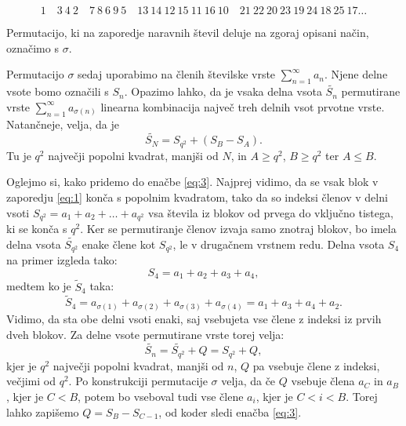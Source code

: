 \documentclass[12pt,a4paper,reqno]{amsart}
\theoremstyle{definition} %
\theoremstyle{plain} %
\newcommand{\N}{\mathbb N}
\begin{document}
\begin{equation}  
1 \quad 3\: 4\: 2 \quad 7\: 8\: 6\: 9\: 5 \quad 13\: 14\: 12\: 15\: 11\: 16\: 10 \quad 21\: 22\: 20\: 23\: 19\: 24\: 18\: 25\: 17 \ldots 
\label{eq:2}
\end{equation}

Permutacijo, ki na zaporedje naravnih števil deluje na zgoraj opisani način, označimo s $\sigma$. 

Permutacijo $\sigma$ sedaj uporabimo na členih številske vrste $\sum^{\infty}_{n=1}a_n$. Njene delne vsote bomo označili s $S_n$. Opazimo lahko, da je vsaka delna vsota $\tilde{S_n}$ permutirane vrste $\sum^{\infty}_{n=1}a_{\sigma(n)}$ linearna kombinacija največ treh delnih vsot prvotne vrste. Natančneje, velja, da je 
\begin{equation}
\tilde{S_N}=S_{q^2}+(S_B-S_A).\label{eq:3} 
\end{equation}
Tu je $q^2$ največji popolni kvadrat, manjši od $N$, in $A \geq q^2$, $B \geq q^2$ ter $A \leq B$. 

Oglejmo si, kako pridemo do enačbe \eqref{eq:3}. Najprej vidimo, da se vsak blok v zaporedju \eqref{eq:1} konča s popolnim kvadratom, tako da so indeksi členov v delni vsoti $S_{q^2}=a_1+a_2+\ldots+a_{q^2}$ vsa števila iz blokov od prvega do vključno tistega, ki se konča s $q^2$. Ker se permutiranje členov izvaja samo znotraj blokov, bo imela delna vsota $\tilde{S_{q^2}}$ enake člene kot $S_{q^2}$, le v drugačnem vrstnem redu. 
Delna vsota $S_4$ na primer izgleda tako: $$S_4 = a_1+a_2+a_3+a_4,$$ medtem ko je $\tilde{S}_4$ taka: $$\tilde{S}_4=a_{\sigma(1)}+a_{\sigma(2)}+a_{\sigma(3)}+a_{\sigma(4)}=a_1+a_3+a_4+a_2.$$ Vidimo, da sta obe delni vsoti enaki, saj vsebujeta vse člene z indeksi iz prvih dveh blokov. Za delne vsote  permutirane vrste torej velja: $$\tilde{S_n}=\tilde{S_{q^2}}+Q=S_{q^2}+Q,$$ kjer je $q^2$ največji popolni kvadrat, manjši od $n$, $Q$ pa vsebuje člene z indeksi, večjimi od $q^2$. Po konstrukciji permutacije $\sigma$ velja, da če $Q$ vsebuje člena $a_C$ in $a_B$, kjer je $C < B$, potem bo vseboval tudi vse člene $a_i$, kjer je $C<i<B$. Torej lahko zapišemo $Q=S_B-S_{C-1}$, od koder sledi enačba \eqref{eq:3}.

\end{document}

